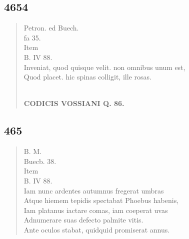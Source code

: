 \documentclass[11pt, a4paper]{report}
\begin{document}
            \subsection*{4654}
      \begin{verse}
      Petron. ed Buech. \\ fa 35. \\ Item \\ B. IV 88. \\ Inveniat, quod quisque velit. non omnibus unum est, \\ Quod placet. hic spinas colligit, ille rosas. \\ 
        ﻿\pagebreak 
    \begin{center} \textbf{CODICIS VOSSIANI Q. 86.} \end{center} \marginpar{[343]} 
      \end{verse}
  
            \subsection*{465}
      \begin{verse}
      B. M. \\ Buecb. 38. \\ Item \\ B. IV 88. \\ Iam nunc ardentes autumnus fregerat umbras \\ Atque hiemem tepidis spectabat Phoebus habenis, \\ Iam platanus iactare comas, iam coeperat uvas \\ Adnumerare suas defecto palmite vitis. \\ Ante oculos stabat, quidquid promiserat annus. \\ 
      \end{verse}
  
\end{document}
